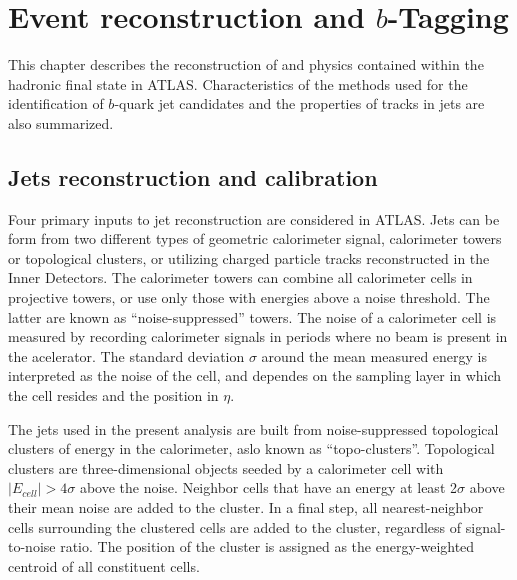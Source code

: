 %
%

\chapter{Event reconstruction and $b$-Tagging }\label{ch:reco}


This chapter describes the reconstruction of and physics contained within the hadronic final state in ATLAS.
Characteristics of the methods used for the identification of $b$-quark jet candidates and the properties of tracks in jets are also summarized. 

\section{Jets reconstruction and calibration}\label{sec:ObjSelection}

Four primary inputs to jet reconstruction are considered in ATLAS. Jets can be form from two different types of geometric calorimeter signal, calorimeter towers or topological clusters, or utilizing charged particle tracks reconstructed in the Inner Detectors. The calorimeter towers can combine all calorimeter cells in projective towers, or use only those with energies above a noise threshold. The latter are known as ``noise-suppressed'' towers.  The noise of a calorimeter cell is measured by recording calorimeter signals in periods where no beam is present in the acelerator.  The standard deviation $\sigma$ around the mean measured energy is interpreted as the noise of the cell, and dependes on the sampling layer in which the cell resides and the position in $\eta$.

The jets used in the present analysis are built from noise-suppressed topological clusters of energy in the calorimeter, aslo known as ``topo-clusters''. Topological clusters are three-dimensional objects seeded by a calorimeter cell with $|E_{cell}| > 4 \sigma$ above the noise. Neighbor cells that have an energy at least 2$\sigma$ above their mean noise are added to the cluster. In a final step, all nearest-neighbor cells surrounding the clustered cells are added to the cluster, regardless of signal-to-noise ratio. The position of the cluster is assigned as the energy-weighted centroid of all constituent cells.  


